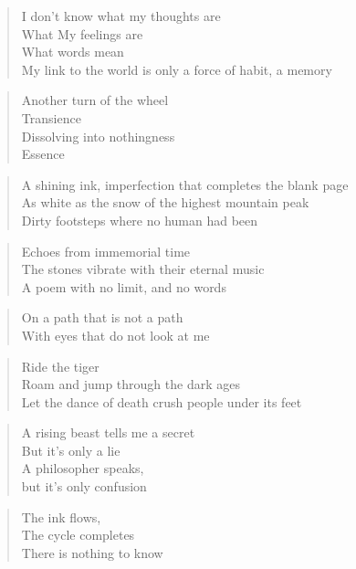 \phantom{;}
\clearpage



    \begin{verse}
    I don't know what my thoughts are\\
    What My feelings are\\
    What words mean\\
    My link to the world is only a force of habit, a memory
    \end{verse}

    \begin{verse}
    Another turn of the wheel\\
    Transience\\
    Dissolving into nothingness\\
    Essence
\end{verse}

    \begin{verse}
    A shining ink, imperfection that completes the blank page\\
    As white as the snow of the highest mountain peak\\
    Dirty footsteps where no human had been
\end{verse}

    \begin{verse}
    Echoes from immemorial time\\
    The stones vibrate with their eternal music\\
    A poem with no limit, and no words
\end{verse}

    \begin{verse}
    On a path that is not a path\\
    With eyes that do not look at me
\end{verse}

    \begin{verse}
    Ride the tiger\\
    Roam and jump through the dark ages\\
    Let the dance of death crush people under its feet
\end{verse}

    \begin{verse}
    A rising beast tells me a secret\\
    But it's only a lie\\
    A philosopher speaks,\\
    but it's only confusion
\end{verse}

    \begin{verse}
    The ink flows,\\
    The cycle completes\\
    There is nothing to know
\end{verse}

\clearpage
